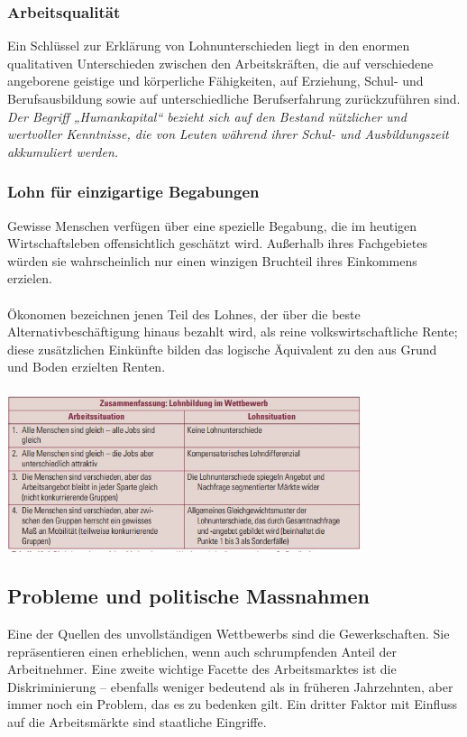 \documentclass[10pt]{scrartcl}
\begin{document}
\subsubsection{Arbeitsqualität}
Ein Schlüssel zur Erklärung von Lohnunterschieden liegt in den enormen qualitativen Unterschieden zwischen den Arbeitskräften, die auf verschiedene angeborene geistige und körperliche Fähigkeiten, auf Erziehung, Schul- und Berufsausbildung sowie auf unterschiedliche Berufserfahrung zurückzuführen sind. \\
{\it Der Begriff „Humankapital“ bezieht sich auf den Bestand nützlicher und wertvoller Kenntnisse, die von Leuten während ihrer Schul- und Ausbildungszeit akkumuliert werden.} 

\subsubsection{Lohn für einzigartige Begabungen}
Gewisse Menschen verfügen über eine spezielle Begabung, die im heutigen Wirtschaftsleben offensichtlich geschätzt wird. Außerhalb ihres Fachgebietes würden sie wahrscheinlich nur einen winzigen Bruchteil ihres Einkommens erzielen.\\ \\
Ökonomen bezeichnen jenen Teil des Lohnes, der über die beste Alternativbeschäftigung hinaus bezahlt wird, als reine volkswirtschaftliche Rente; diese zusätzlichen Einkünfte bilden das logische Äquivalent zu den aus Grund und Boden erzielten Renten.\\
\\
\includegraphics[width=0.78\textwidth]{img/arbeit.jpg}


\subsection{Probleme und politische Massnahmen}
Eine der Quellen des unvollständigen Wettbewerbs sind die Gewerkschaften. Sie repräsentieren einen erheblichen, wenn auch schrumpfenden Anteil der Arbeitnehmer. Eine zweite wichtige Facette des Arbeitsmarktes ist die Diskriminierung – ebenfalls weniger bedeutend als in früheren Jahrzehnten, aber immer noch ein Problem, das es zu bedenken gilt. Ein dritter Faktor mit Einfluss auf die Arbeitsmärkte sind staatliche Eingriffe. \\
\end{document}
